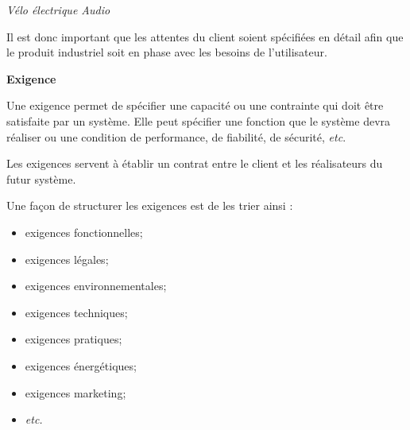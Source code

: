 \documentclass[11pt,oneside]{article}
\begin{document}
\begin{exemple}
\begin{minipage}[c]{.22\linewidth}
\begin{center}
\textit{Vélo électrique Audio \cite{audi}}
\end{center}
\end{minipage}

Il est donc important que les attentes du client soient spécifiées en détail afin que le produit industriel soit en phase avec les besoins de l'utilisateur. 


\end{exemple}



%
%
%

\begin{defi}
\textbf{Exigence} \cite{roques}

Une exigence permet de spécifier une capacité ou une contrainte qui doit être satisfaite par un système. Elle peut spécifier une fonction que le système devra réaliser ou une condition de performance, de fiabilité, de sécurité, \textit{etc}.

Les exigences servent à établir un contrat entre le client et les réalisateurs du futur système.

\end{defi}

\begin{rem}
Une façon de structurer les exigences est de les trier ainsi :
\begin{itemize}
\item exigences fonctionnelles;
\item exigences légales;
\item exigences environnementales;
\item exigences techniques;
\item exigences pratiques;
\item exigences énergétiques;
\item exigences marketing;
\item \textit{etc.}
\end{itemize}
\end{rem}


%
%
\end{document}
